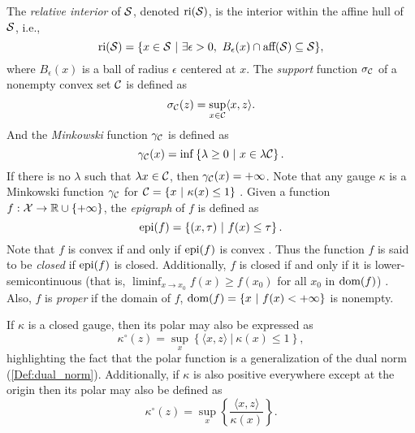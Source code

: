 The \textit{relative interior} of ${\mathcal S}$, denoted $\textnormal{ri}({\mathcal S})$, is the interior within the affine hull of ${\mathcal S}$, i.e.,
\begin{equation}			\label{Def:relative_interior}
\text{ri}(\caS) = \{ x \in \caS \ | \ \exists \epsilon > 0, \ B_\epsilon(x) \cap \text{aff}(\caS) \subseteq \caS  \},
\end{equation}
where $B_\epsilon(x)$ is a ball of radius $\epsilon$ centered at $x$.
The \textit{support} function $\sigma_{\mathcal C}$ of a nonempty convex set ${\mathcal C}$ is defined as
\begin{equation}		\label{Def:support_function}
\sigma_{\mathcal C}(z) = \sup_{x \in {\mathcal C}} \langle x, z \rangle.
\end{equation}
And the \textit{Minkowski} function $\gamma_{\mathcal C}$ is defined as
\begin{equation}			\label{Def:Minkowski_function}
\gamma_{\mathcal C}(x) = \inf \left\{ \lambda \geq 0 \ | \ x \in \lambda {\mathcal C}  \right\}.
\end{equation}
If there is no $\lambda$ such that $\lambda x \in {\mathcal C}$, then $\gamma_{\mathcal C}(x) = + \infty$.  Note that any gauge $\kappa$ is a Minkowski function $\gamma_{\mathcal C}$ for ${\mathcal C} = \{ x \ | \ \kappa(x) \leq 1 \}$ \cite[Section 15]{rockafellar1970convex}.  Given a function $f : {\mathcal X} \rightarrow {\mathbb R} \cup \{+\infty\}$, the \textit{epigraph} of $f$ is defined as
\begin{equation}		\label{Eqn:epigraph}
\textnormal{epi}(f) = \left\{ (x, \tau) \ | \ f(x) \leq \tau  \right\}.
\end{equation}
Note that $f$ is convex if and only if $\textnormal{epi}(f)$ is convex \cite[Section 7]{rockafellar1970convex}.  Thus the function $f$ is said to be \textit{closed} if $\textnormal{epi}(f)$ is closed.  Additionally, $f$ is closed if and only if it is lower-semicontinuous (that is, $\liminf_{x \rightarrow x_0} f(x) \geq f(x_0)$ for all $x_0$ in $\textnormal{dom}(f)$) \cite[Section 7]{rockafellar1970convex}.  Also, $f$ is \textit{proper} if the domain of $f$, $\textnormal{dom}(f) = \{ x \ | \ f(x) < +\infty \}$ is nonempty.  

If $\kappa$ is a closed gauge, then its polar may also be expressed as \cite[Section 15]{rockafellar1970convex}
\begin{equation}			\label{Def:polar_function_3}
\kappa^\circ(z) = \sup\limits_x \left\{ \langle x, z \rangle \ | \ \kappa(x) \leq 1 \right\},
\end{equation}
highlighting the fact that the polar function is a generalization of the dual norm (\ref{Def:dual_norm}).  Additionally, if $\kappa$ is also positive everywhere except at the origin then its polar may also be defined as \cite[Section 15]{rockafellar1970convex}
\begin{equation}			\label{Def:polar_function_4}
\kappa^\circ(z) = \sup\limits_x \left\{ \frac{\langle x, z \rangle}{\kappa(x)} \right\}.
\end{equation}





